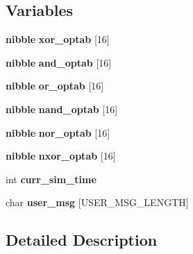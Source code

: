 \subsection*{Variables}
\begin{CompactItemize}
\item 
{\bf nibble} {\bf xor\_\-optab} [16]
\item 
{\bf nibble} {\bf and\_\-optab} [16]
\item 
{\bf nibble} {\bf or\_\-optab} [16]
\item 
{\bf nibble} {\bf nand\_\-optab} [16]
\item 
{\bf nibble} {\bf nor\_\-optab} [16]
\item 
{\bf nibble} {\bf nxor\_\-optab} [16]
\item 
int {\bf curr\_\-sim\_\-time}
\item 
char {\bf user\_\-msg} [USER\_\-MSG\_\-LENGTH]
\end{CompactItemize}


\subsection{Detailed Description}


